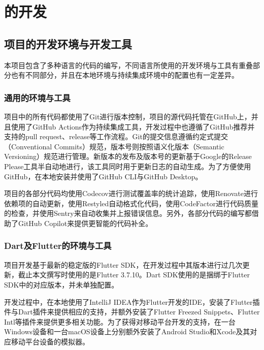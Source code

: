 

\chapter{\app 的开发}\label{ch:dev}


\section{项目的开发环境与开发工具}\label{sec:env}

本项目包含了多种语言的代码的编写，不同语言所使用的开发环境与工具有重叠部分也有不同部分，并且在本地环境与持续集成环境中的配置也有一定差异。

\subsection{通用的环境与工具}\label{subsec:common-env}

项目中的所有代码都使用了Git进行版本控制，项目的源代码托管在GitHub上，并且使用了GitHub Actions作为持续集成工具，开发过程中也遵循了GitHub推荐并支持的pull request、release等工作流程。Git的提交信息遵循约定式提交（Conventional Commits）规范，版本号则按照语义化版本（Semantic Versioning）规范进行管理。新版本的发布及版本号的更新基于Google的Release Please工具半自动地进行，该工具同时用于更新日志的自动生成。为了方便使用GitHub，在本地安装并使用了GitHub CLI与GitHub Desktop。

项目的各部分代码均使用Codecov进行测试覆盖率的统计追踪，使用Renovate进行依赖项的自动更新，使用Restyled自动格式化代码，使用CodeFactor进行代码质量的检查，并使用Sentry来自动收集并上报错误信息。另外，各部分代码的编写都借助了GitHub Copilot来提供更智能的代码补全。

\subsection{Dart及Flutter的环境与工具}\label{subsec:dart-env}

项目开发基于最新的稳定版的Flutter SDK，在开发过程中其版本进行过几次更新，截止本文撰写时使用的是Flutter 3.7.10。Dart SDK使用的是捆绑于Flutter SDK中的对应版本，并未单独配置。

开发过程中，在本地使用了IntelliJ IDEA作为Flutter开发的IDE，安装了Flutter插件与Dart插件来提供相应的支持，并额外安装了Flutter Freezed Snippets、Flutter Intl等插件来提供更多相关功能。为了获得对移动平台开发的支持，在一台Windows设备和一台macOS设备上分别额外安装了Android Studio和Xcode及其对应移动平台设备的模拟器。

